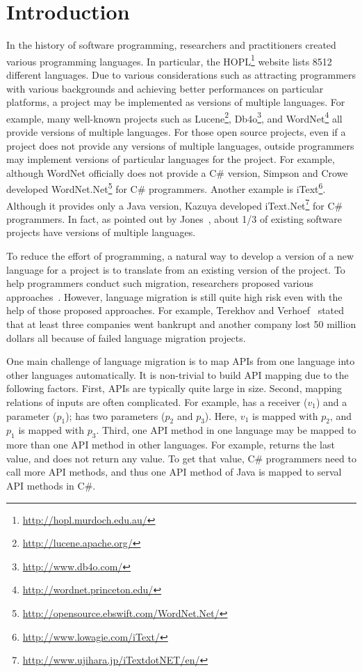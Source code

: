\section{Introduction}
\label{sec:introduction} In the history of software programming,
researchers and practitioners created various programming languages.
In particular, the HOPL\footnote{\url{http://hopl.murdoch.edu.au/}}
website lists 8512 different languages. Due to various
considerations such as attracting programmers with various
backgrounds and achieving better performances on particular
platforms, a project may be implemented as versions of multiple
languages. For example, many well-known projects such as
Lucene\footnote{\url{http://lucene.apache.org/}},
Db4o\footnote{\url{http://www.db4o.com/}}, and
WordNet\footnote{\url{http://wordnet.princeton.edu/}} all provide
versions of multiple languages. For those open source projects, even
if a project does not provide any versions of multiple languages,
outside programmers may implement versions of particular languages
for the project. For example, although WordNet officially does not
provide a C\# version, Simpson and Crowe developed
WordNet.Net\footnote{\url{http://opensource.ebswift.com/WordNet.Net/}}
for C\# programmers. Another example is
iText\footnote{\url{http://www.lowagie.com/iText/}}. Although it
provides only a Java version, Kazuya developed
iText.Net\footnote{\url{http://www.ujihara.jp/iTextdotNET/en/}} for
C\# programmers. In fact, as pointed out by
Jones~\cite{jones1998estimating}, about 1/3 of existing software
projects have versions of multiple languages.

To reduce the effort of programming, a natural way to develop a
version of a new language for a project is to translate from an
existing version of the project. To help programmers conduct such
migration, researchers proposed various
approaches~\cite{mossienko2003automated,yasumatsu1995spice,hainaut2008migration}.
However, language migration is still quite high risk even with the
help of those proposed approaches. For example, Terekhov and
Verhoef~\cite{terekhov2000realities} stated that at least three
companies went bankrupt and another company lost 50 million dollars
all because of failed language migration projects.

One main challenge of language migration is to map APIs from one
language into other languages automatically. It is non-trivial to
build API mapping due to the following factors. First, APIs are
typically quite large in size. Second, mapping relations of inputs
are often complicated. For example,
 has a receiver
($v_1$) and a parameter ($p_1$);  has two parameters ($p_2$ and
$p_3$). Here, $v_1$ is mapped with $p_2$, and $p_1$ is mapped with
$p_3$. Third, one API method in one language may be mapped to more
than one API method in other languages. For example,
 returns the last value,
and 
does not return any value. To get that value, C\# programmers need
to call more API methods, and thus one API method of Java is mapped
to serval API methods in C\#.


